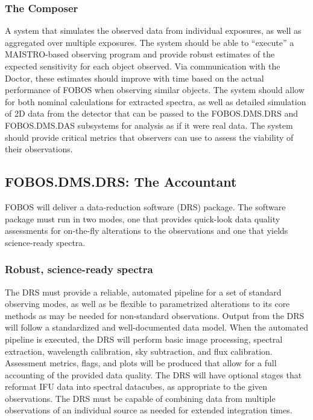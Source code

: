 \documentclass[oneside,11pt]{amsart}
\begin{document}
\subsubsection{The Composer}

A system that simulates the observed data from individual exposures,
as well as aggregated over multiple exposures. The system should be
able to “execute” a MAISTRO-based observing program and provide
robust estimates of the expected sensitivity for each object
observed. Via communication with the Doctor, these estimates should
improve with time based on the actual performance of FOBOS when
observing similar objects. The system should allow for both nominal
calculations for extracted spectra, as well as detailed simulation of
2D data from the detector that can be passed to the FOBOS.DMS.DRS and
FOBOS.DMS.DAS subsystems for analysis as if it were real data. The
system should provide critical metrics that observers can use to
assess the viability of their observations.

\subsection{FOBOS.DMS.DRS: The Accountant}

FOBOS will deliver a data-reduction software (DRS) package. The
software package must run in two modes, one that provides quick-look
data quality assessments for on-the-fly alterations to the
observations and one that yields science-ready spectra.

\subsubsection{Robust, science-ready spectra}

The DRS must provide a reliable, automated pipeline for a set of
standard observing modes, as well as be flexible to parametrized
alterations to its core methods as may be needed for non-standard
observations. Output from the DRS will follow a standardized and
well-documented data model. When the automated pipeline is executed,
the DRS will perform basic image processing, spectral extraction,
wavelength calibration, sky subtraction, and flux calibration.
Assessment metrics, flags, and plots will be produced that allow for
a full accounting of the provided data quality. The DRS will have
optional stages that reformat IFU data into spectral datacubes, as
appropriate to the given observations. The DRS must be capable of
combining data from multiple observations of an individual source as
needed for extended integration times.
\end{document}
